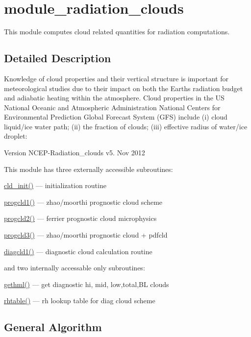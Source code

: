 \hypertarget{group__module__radiation__clouds}{}\section{module\+\_\+radiation\+\_\+clouds}
\label{group__module__radiation__clouds}


This module computes cloud related quantities for radiation computations.  




\subsection{Detailed Description}
Knowledge of cloud properties and their vertical structure is important for meteorological studies due to their impact on both the Earth\textquotesingle{}s radiation budget and adiabatic heating within the atmosphere. Cloud properties in the US National Oceanic and Atmospheric Administration National Centers for Environmental Prediction Global Forecast System (G\+FS) include (i) cloud liquid/ice water path; (ii) the fraction of clouds; (iii) effective radius of water/ice droplet\+: \begin{DoxyVersion}{Version}
N\+C\+E\+P-\/\+Radiation\+\_\+clouds v5. Nov 2012
\end{DoxyVersion}
This module has three externally accessible subroutines\+:
\begin{DoxyItemize}
\item \hyperlink{group__module__radiation__clouds_ga0e1ee94c9ca85849a219803325a61184}{cld\+\_\+init()} --- initialization routine
\item \hyperlink{group__module__radiation__clouds_gafa23f5bc69fa713abfa32939fd96ade8}{progcld1()} --- zhao/moorthi prognostic cloud scheme
\item \hyperlink{group__module__radiation__clouds_ga3fd7643ce526761b17d04eec6a332333}{progcld2()} --- ferrier prognostic cloud microphysics
\item \hyperlink{group__module__radiation__clouds_gaeab51a06b22516fbfc78ab2c9eaf2622}{progcld3()} --- zhao/moorthi prognostic cloud + pdfcld
\item \hyperlink{group__module__radiation__clouds_ga022c3706242426745001b7837ae801a3}{diagcld1()} --- diagnostic cloud calculation routine
\end{DoxyItemize}

and two internally accessable only subroutines\+:
\begin{DoxyItemize}
\item \hyperlink{group__module__radiation__clouds_gac231d967afcfb252dedba82e9085b34d}{gethml()} --- get diagnostic hi, mid, low,total,BL clouds
\item \hyperlink{group__module__radiation__clouds_ga9b3f43844a53e79cd5c348f8c72ec408}{rhtable()} --- rh lookup table for diag cloud scheme
\end{DoxyItemize}\hypertarget{group___g_f_s__ozn_gen_al}{}\subsection{General Algorithm}\label{group___g_f_s__ozn_gen_al}

